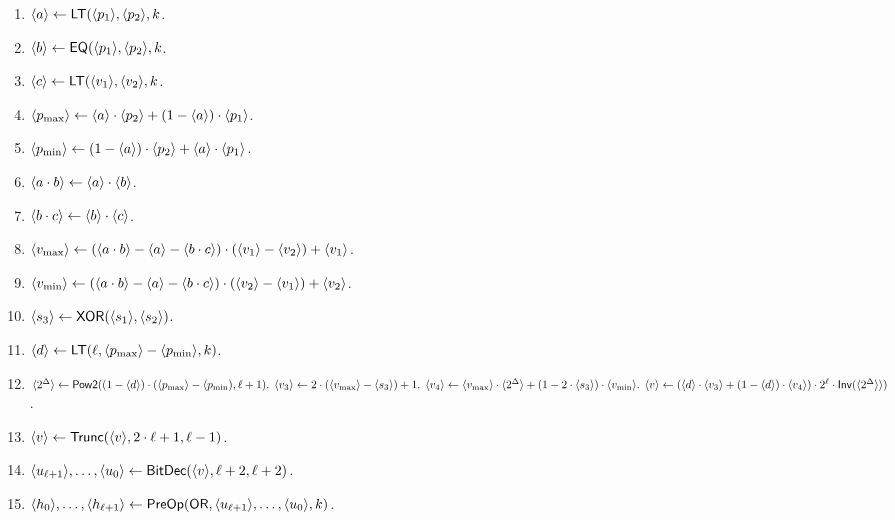 \begin{enumerate}
\item $\langle a \rangle \leftarrow \mathsf{LT}(\langle p_1 \rangle,\langle p_2 \rangle,k$.
\item $\langle b \rangle \leftarrow \mathsf{EQ}(\langle p_1 \rangle,\langle p_2 \rangle,k$. 
\item $\langle c \rangle \leftarrow \mathsf{LT}(\langle v_1 \rangle,\langle v_2 \rangle,k$.
\item $\langle p_{\max} \rangle \leftarrow \langle a \rangle \cdot \langle p_2 \rangle + (1-\langle a \rangle) \cdot \langle p_1 \rangle$.
\item $\langle p_{\min} \rangle \leftarrow (1-\langle a \rangle) \cdot  \langle p_2 \rangle + \langle a \rangle \cdot \langle p_1 \rangle$.
\item $\langle a \cdot b \rangle \leftarrow \langle a \rangle \cdot \langle b \rangle$.
\item $\langle b \cdot c \rangle \leftarrow \langle b \rangle \cdot \langle c \rangle$.
\item $\langle v_{\max} \rangle \leftarrow 
	(\langle a \cdot b \rangle-\langle a \rangle-\langle b \cdot c \rangle) \cdot (\langle v_1 \rangle-\langle v_2 \rangle)
			   + \langle v_1 \rangle$.
\item $\langle v_{\min} \rangle \leftarrow 
	(\langle a \cdot b \rangle-\langle a \rangle-\langle b \cdot c \rangle) \cdot (\langle v_2 \rangle-\langle v_1 \rangle)
			   + \langle v_2 \rangle$.
\item $\langle s_3 \rangle \leftarrow \mathsf{XOR}(\langle s_1 \rangle,\langle s_2 \rangle)$.
\item $\langle d \rangle \leftarrow \mathsf{LT}(\ell, \langle p_{\max} \rangle-\langle p_{\min} \rangle, k)$.
\item $\sshare{2^\Delta} \asn \mathsf{Pow2}((1-\sshare{d}) \cdot (\sshare{p_{\max}}-\sshare{p_{\min}),\ell+1)$.
\item $\sshare{v_3} \asn 2 \cdot (\sshare{v_{\max}}-\sshare{s_3})+1$.
\item $\sshare{v_4} \asn \sshare{v_{\max}} \cdot \sshare{2^\Delta}+(1-2 \cdot \sshare{s_3}) \cdot \sshare{v_{\min}}$.
\item $\sshare{v} \asn (\sshare{d} \cdot \sshare{v_3}+(1-\sshare{d}) \cdot \sshare{v_4})
		\cdot 2^\ell \cdot \mathsf{Inv}(\sshare{2^\Delta}})$.
\item $\langle v \rangle \leftarrow \mathsf{Trunc}(\langle v \rangle,2 \cdot \ell+1,\ell-1)$.
\item $\langle u_{\ell+1} \rangle,\ldots,\langle u_0 \rangle \leftarrow \mathsf{BitDec}(\langle v \rangle,\ell+2,\ell+2)$.
\item $\langle h_0 \rangle,\ldots,\langle h_{\ell+1} \rangle \leftarrow \mathsf{PreOp}(\mathsf{OR},\langle u_{\ell+1} \rangle,\ldots,\langle u_0 \rangle,k)$.

\end{enumerate}
